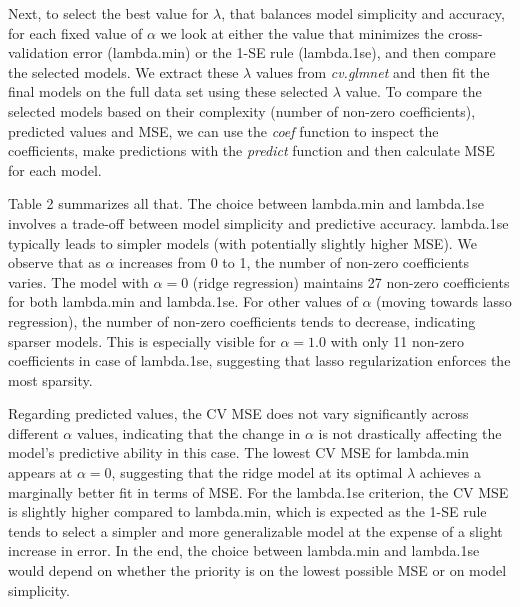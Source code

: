 \documentclass[
]{article}
\begin{document}
Next, to select the best value for \(\lambda\), that balances model
simplicity and accuracy, for each fixed value of \(\alpha\) we look at
either the value that minimizes the cross-validation error (lambda.min)
or the 1-SE rule (lambda.1se), and then compare the selected models. We
extract these \(\lambda\) values from \textit{cv.glmnet} and then fit
the final models on the full data set using these selected \(\lambda\)
value. To compare the selected models based on their complexity (number
of non-zero coefficients), predicted values and MSE, we can use the
\textit{coef} function to inspect the coefficients, make predictions
with the \textit{predict} function and then calculate MSE for each
model.

Table 2 summarizes all that. The choice between lambda.min and
lambda.1se involves a trade-off between model simplicity and predictive
accuracy. lambda.1se typically leads to simpler models (with potentially
slightly higher MSE). We observe that as \(\alpha\) increases from 0 to
1, the number of non-zero coefficients varies. The model with
\(\alpha = 0\) (ridge regression) maintains 27 non-zero coefficients for
both lambda.min and lambda.1se. For other values of \(\alpha\) (moving
towards lasso regression), the number of non-zero coefficients tends to
decrease, indicating sparser models. This is especially visible for
\(\alpha = 1.0\) with only 11 non-zero coefficients in case of
lambda.1se, suggesting that lasso regularization enforces the most
sparsity.

Regarding predicted values, the CV MSE does not vary significantly
across different \(\alpha\) values, indicating that the change in
\(\alpha\) is not drastically affecting the model's predictive ability
in this case. The lowest CV MSE for lambda.min appears at
\(\alpha = 0\), suggesting that the ridge model at its optimal
\(\lambda\) achieves a marginally better fit in terms of MSE. For the
lambda.1se criterion, the CV MSE is slightly higher compared to
lambda.min, which is expected as the 1-SE rule tends to select a simpler
and more generalizable model at the expense of a slight increase in
error. In the end, the choice between lambda.min and lambda.1se would
depend on whether the priority is on the lowest possible MSE or on model
simplicity.
\end{document}
